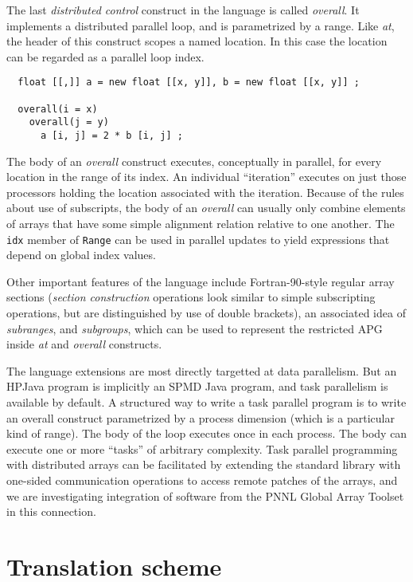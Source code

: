 The last {\em distributed control} construct in the language
is called {\em overall}.  It implements a distributed parallel loop,
and is parametrized by a range.  Like {\em at}, the header of this
construct scopes a named location.  In this case the location can
be regarded as a parallel loop index.
\small
\begin{verbatim}
  float [[,]] a = new float [[x, y]], b = new float [[x, y]] ;

  overall(i = x)
    overall(j = y)
      a [i, j] = 2 * b [i, j] ;
\end{verbatim}
\normalsize
The body of an {\em overall} construct executes, conceptually in
parallel, for every location in the range of its index.  An individual
``iteration'' executes on just those processors holding the location
associated with the iteration.  Because of the rules about use of
subscripts, the body of an {\em overall} can usually only combine
elements of arrays that have some simple alignment relation relative to
one another.  The {\tt idx} member of {\tt Range} can be used in
parallel updates to yield expressions that depend on global index
values.

Other important features of the language include Fortran-90-style
regular array sections ({\em section construction} operations look
similar to simple subscripting operations, but are distinguished by use
of double brackets), an associated idea of {\em subranges}, and {\em
subgroups}, which can be used to represent the restricted APG inside
{\em at} and {\em overall} constructs.

The language extensions are most directly targetted at data parallelism.
But an HPJava program is implicitly an SPMD Java program, and task parallelism
is available by default.  A structured way to write a task parallel
program is to write an overall construct parametrized by a process
dimension (which is a particular kind of range).  The body of the loop
executes once in each process.  The body can execute one or more ``tasks''
of arbitrary complexity.  Task parallel programming with distributed
arrays can be facilitated by extending the standard library with
one-sided communication operations to access remote patches of the
arrays, and we are investigating integration of software from the
PNNL Global Array Toolset \cite{Global_Arrays} in this connection.

\section{Translation scheme}
\label{sec:scheme}

